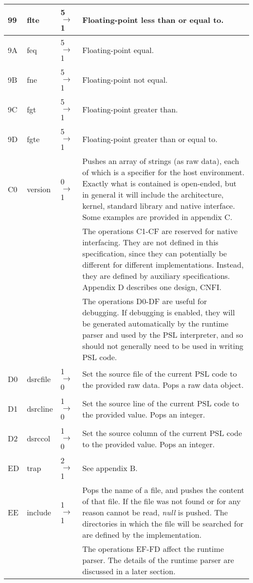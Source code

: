 \begin{longtable}{ | l | l | l | X | }
\hline
99 & flte & 5 $\rightarrow$ 1 & Floating-point less than or equal to. \\
\hline
9A & feq & 5 $\rightarrow$ 1 & Floating-point equal. \\
\hline
9B & fne & 5 $\rightarrow$ 1 & Floating-point not equal. \\
\hline
9C & fgt & 5 $\rightarrow$ 1 & Floating-point greater than. \\
\hline
9D & fgte & 5 $\rightarrow$ 1 & Floating-point greater than or equal to. \\
\hline
C0 & version & 0 $\rightarrow$ 1 & Pushes an array of strings (as raw data), each of which is a specifier for the host environment. Exactly what is contained is open-ended, but in general it will include the architecture, kernel, standard library and native interface. Some examples are provided in appendix C. \\
\hline
  &   &   & The operations C1-CF are reserved for native interfacing. They are not defined in this specification, since they can potentially be different for different implementations. Instead, they are defined by auxiliary specifications. Appendix D describes one design, CNFI. \\
\hline
  &   &   & The operations D0-DF are useful for debugging. If debugging is enabled, they will be generated automatically by the runtime parser and used by the PSL interpreter, and so should not generally need to be used in writing PSL code. \\
\hline
D0 & dsrcfile & 1 $\rightarrow$ 0 & Set the source file of the current PSL code to the provided raw data. Pops a raw data object. \\
\hline
D1 & dsrcline & 1 $\rightarrow$ 0 & Set the source line of the current PSL code to the provided value. Pops an integer. \\
\hline
D2 & dsrccol & 1 $\rightarrow$ 0 & Set the source column of the current PSL code to the provided value. Pops an integer. \\
\hline
ED & trap & 2 $\rightarrow$ 1 & See appendix B. \\
\hline
EE & include & 1 $\rightarrow$ 1 & Pops the name of a file, and pushes the content of that file. If the file was not found or for any reason cannot be read, \textit{null} is pushed. The directories in which the file will be searched for are defined by the implementation. \\
\hline
  &   &   & The operations EF-FD affect the runtime parser. The details of the runtime parser are discussed in a later section. \\

\end{longtable}
